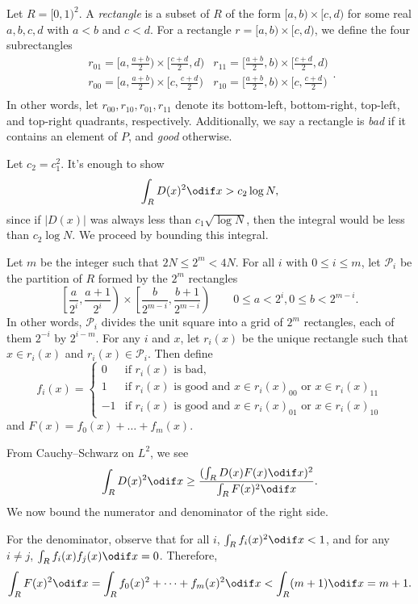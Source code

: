 \documentclass[11pt]{scrartcl}
\begin{document}
Let $R = [0,1)^2$. A \emph{rectangle} is a subset of $R$ of the form $[a,b) \times [c,d)$ for some real $a,b,c,d$ with $a < b$ and $c < d$. For a rectangle $r = [a,b) \times [c,d)$, we define the four subrectangles
\[
    \begin{array}{cc}
        r_{01} = [a,\frac{a + b}2) \times [\frac{c + d}2,d) & r_{11} = [\frac{a + b}2,b) \times [\frac{c + d}2,d) \\
        r_{00} = [a,\frac{a + b}2) \times [c,\frac{c + d}2) & r_{10} = [\frac{a + b}2,b) \times [c,\frac{c + d}2) \\
    \end{array}.
\]
In other words, let $r_{00},r_{10},r_{01},r_{11}$ denote its bottom-left, bottom-right, top-left, and top-right quadrants, respectively. Additionally, we say a rectangle is \emph{bad} if it contains an element of $P$, and \emph{good} otherwise. 

Let $c_2 = c_1^2$. It's enough to show
\[\int_R D(x)^2 \odif x > c_2\log N,\]
since if $\lvert D(x)\rvert$ was always less than $c_1\sqrt{\log N}$, then the integral would be less than $c_2\log N$. We proceed by bounding this integral.

Let $m$ be the integer such that $2N \le 2^m < 4N$. For all $i$ with $0 \le i \le m$, let $\mathscr P_i$ be the partition of $R$ formed by the $2^m$ rectangles
\[\left[\frac a{2^i},\frac{a + 1}{2^i}\right) \times \left[\frac b{2^{m - i}},\frac{b + 1}{2^{m - i}}\right) \qquad 0 \le a < 2^i,0 \le b < 2^{m - i}.\]
In other words, $\mathscr P_i$ divides the unit square into a grid of $2^m$ rectangles, each of them $2^{-i}$ by $2^{i - m}$. For any $i$ and $x$, let $r_i(x)$ be the unique rectangle such that $x \in r_i(x)$ and $r_i(x) \in \mathscr P_i$. Then define
\[f_i(x) = \begin{cases}
    0 & \text{if $r_i(x)$ is bad,} \\
    1 & \text{if $r_i(x)$ is good and $x \in r_i(x)_{00}$ or $x \in r_i(x)_{11}$} \\
    -1 & \text{if $r_i(x)$ is good and $x \in r_i(x)_{01}$ or $x \in r_i(x)_{10}$}
\end{cases}\]
and $F(x) = f_0(x) + \dots + f_m(x)$.

From Cauchy--Schwarz on $L^2$, we see
\[\int_R D(x)^2 \odif x \ge \frac{(\int_R D(x)F(x) \odif x)^2}{\int_R F(x)^2 \odif x}.\]
We now bound the numerator and denominator of the right side.

For the denominator, observe that for all $i$, $\int_R f_i(x)^2 \odif x < 1$, and for any $i \neq j$, $\int_R f_i(x)f_j(x) \odif x = 0$. Therefore,
\[\int_R F(x)^2 \odif x = \int_R f_0(x)^2 + \dots + f_m(x)^2 \odif x < \int_R (m + 1) \odif x = m + 1.\]
\end{document}
